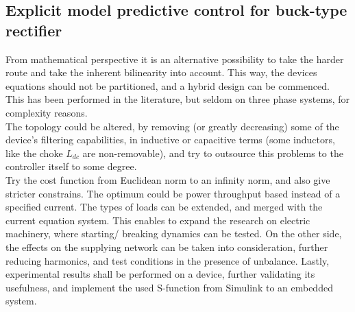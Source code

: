 		\subsection{Explicit model predictive control for buck-type rectifier}
		
		From mathematical perspective it is an alternative possibility to take the harder route and take the inherent bilinearity into account. This way, the devices equations should not be partitioned, and a hybrid design can be commenced. This has been performed in the literature, but seldom on three phase systems, for complexity reasons.\\ The topology could be altered, by removing (or greatly decreasing) some of the device's filtering  capabilities, in inductive or capacitive terms (some inductors, like the choke $L_{dc}$ are non-removable), and try to outsource this problems to the controller itself to some degree.\\
		Try the cost function from Euclidean norm to an infinity norm, and also give stricter constrains. The optimum could be power throughput based instead of a specified current. The types of loads can be extended, and merged with the current equation system. This enables to expand the research on electric machinery, where starting/ breaking dynamics can be tested. On the other side, the effects on the supplying network can be taken into consideration, further reducing harmonics, and test conditions in the presence of unbalance.
		Lastly, experimental results shall be performed on a device, further validating its usefulness, and implement the used S-function from Simulink to an embedded system.
